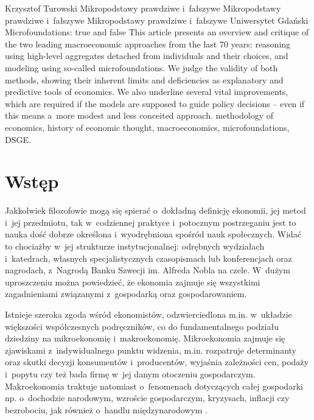 \begin{artplenv}{Krzysztof Turowski}
	{Mikropodstawy prawdziwe i~fałszywe}
	{Mikropodstawy prawdziwe i~fałszywe}
	{Mikropodstawy prawdziwe i~fałszywe}
	{Uniwersytet Gdański}
	{Microfoundations: true and false}
	{This article presents an overview and critique of the two leading macroeconomic approaches from the last 70 years:
		reasoning using high-level aggregates detached from individuals and their choices, and modeling using so-called
		microfoundations. We judge the validity of both methods, showing their inherent limits and deficiencies as explanatory
		and predictive tools of economics. We also underline several vital improvements, which are required if the models are
		supposed to guide policy decisions -- even if this means a~more modest and less conceited approach.}
	{methodology of economics, history of economic thought, macroeconomics, microfoundations, DSGE.}



\section*{Wstęp}
\lettrine[loversize=0.13,lines=2,lraise=-0.05,nindent=0em,findent=0.2pt]%
{J}{}akkolwiek filozofowie mogą się spierać o~dokładną definicję ekonomii, jej metod i~jej przedmiotu, tak w~codziennej
praktyce i~potocznym postrzeganiu jest to nauka dość dobrze określona i~wyodrębniona spośród nauk społecznych. Widać to
chociażby w~jej strukturze instytucjonalnej: odrębnych wydziałach i~katedrach, własnych specjalistycznych czasopismach
lub konferencjach oraz nagrodach, z~Nagrodą Banku Szwecji im. Alfreda Nobla na czele. W~dużym uproszczeniu można
powiedzieć, że ekonomia zajmuje się wszystkimi zagadnieniami związanymi z~gospodarką oraz gospodarowaniem.

Istnieje szeroka zgoda wśród ekonomistów, odzwierciedlona m.in. w~układzie większości współczesnych podręczników, co do
fundamentalnego podziału dziedziny na mikroekonomię i~makroekonomię. Mikroekonomia zajmuje się
zjawiskami z~indywidualnego punktu widzenia, m.in. rozpatruje determinanty oraz skutki decyzji konsumentów i~producentów, wyjaśnia
zależności cen, podaży i~popytu czy też bada firmę w~jej danym otoczeniu gospodarczym. Makroekonomia traktuje natomiast
o~fenomenach dotyczących całej gospodarki np. o~dochodzie narodowym, wzroście gospodarczym, kryzysach, inflacji czy
bezrobociu, jak również o~handlu międzynarodowym
\parencite{samuelson_ekonomia_2003}.


\end{artplenv}
